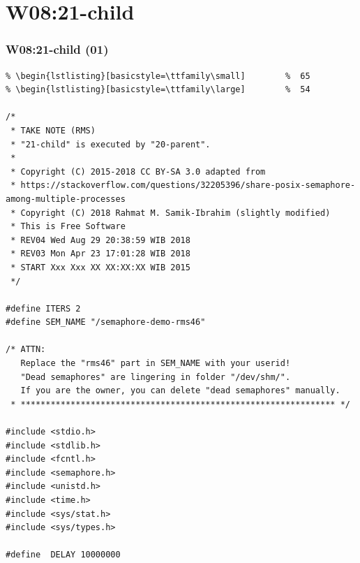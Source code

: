 \documentclass[xcolor=table, notheorems, hyperref={pdfpagelabels=false}]{beamer}
\begin{document}
\section{W08:21-child}
\begin{frame}[fragile]
\frametitle{W08:21-child (01)}
\begin{lstlisting}[basicstyle=\ttfamily\tiny]         % 108
% \begin{lstlisting}[basicstyle=\ttfamily\footnotesize] %  72
% \begin{lstlisting}[basicstyle=\ttfamily\small]        %  65
% \begin{lstlisting}[basicstyle=\ttfamily\large]        %  54

/*
 * TAKE NOTE (RMS)
 * "21-child" is executed by "20-parent".
 *
 * Copyright (C) 2015-2018 CC BY-SA 3.0 adapted from 
 * https://stackoverflow.com/questions/32205396/share-posix-semaphore-among-multiple-processes
 * Copyright (C) 2018 Rahmat M. Samik-Ibrahim (slightly modified)
 * This is Free Software
 * REV04 Wed Aug 29 20:38:59 WIB 2018
 * REV03 Mon Apr 23 17:01:28 WIB 2018
 * START Xxx Xxx XX XX:XX:XX WIB 2015
 */

#define ITERS 2
#define SEM_NAME "/semaphore-demo-rms46"

/* ATTN:
   Replace the "rms46" part in SEM_NAME with your userid!
   "Dead semaphores" are lingering in folder "/dev/shm/".
   If you are the owner, you can delete "dead semaphores" manually.
 * *************************************************************** */

#include <stdio.h>
#include <stdlib.h>
#include <fcntl.h>
#include <semaphore.h>
#include <unistd.h>
#include <time.h>
#include <sys/stat.h>
#include <sys/types.h>

#define  DELAY 10000000

\end{lstlisting}
\end{frame}
\end{document}

